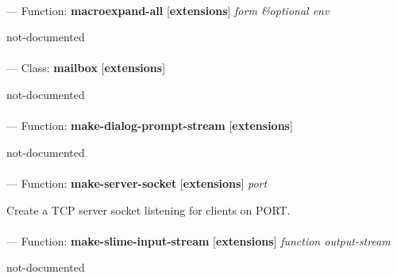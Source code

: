 \paragraph{}
\label{EXTENSIONS:MACROEXPAND-ALL}
--- Function: \textbf{macroexpand-all} [\textbf{extensions}] \textit{form \&optional env}

\begin{adjustwidth}{5em}{5em}
not-documented
\end{adjustwidth}

\paragraph{}
\label{EXTENSIONS:MAILBOX}
--- Class: \textbf{mailbox} [\textbf{extensions}] \textit{}

\begin{adjustwidth}{5em}{5em}
not-documented
\end{adjustwidth}

\paragraph{}
\label{EXTENSIONS:MAKE-DIALOG-PROMPT-STREAM}
--- Function: \textbf{make-dialog-prompt-stream} [\textbf{extensions}] \textit{}

\begin{adjustwidth}{5em}{5em}
not-documented
\end{adjustwidth}

\paragraph{}
\label{EXTENSIONS:MAKE-SERVER-SOCKET}
--- Function: \textbf{make-server-socket} [\textbf{extensions}] \textit{port}

\begin{adjustwidth}{5em}{5em}
Create a TCP server socket listening for clients on PORT.
\end{adjustwidth}

\paragraph{}
\label{EXTENSIONS:MAKE-SLIME-INPUT-STREAM}
--- Function: \textbf{make-slime-input-stream} [\textbf{extensions}] \textit{function output-stream}

\begin{adjustwidth}{5em}{5em}
not-documented
\end{adjustwidth}

